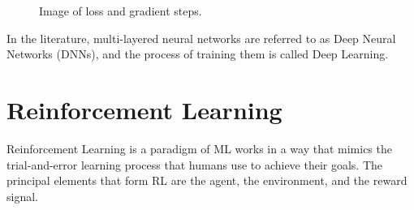 \begin{figure}[ht]
    \begin{center}
        \fbox{\rule[-.5cm]{0cm}{4cm} \rule[-.5cm]{4cm}{0cm}}
    \end{center}
    \caption{Image of loss and gradient steps.}
    \label{fig:gradient_descent}
\end{figure}

In the literature, multi-layered neural networks are referred to as Deep Neural Networks (DNNs), and the process of training them is called Deep Learning.

%
%
%



\section{Reinforcement Learning}
\label{sec:rl}

Reinforcement Learning is a paradigm of ML works in a way that mimics the trial-and-error learning process that humans use to achieve their goals.
The principal elements that form RL are the agent, the environment, and the reward signal.

